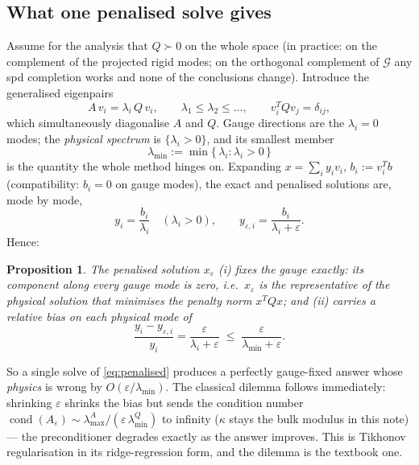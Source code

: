 \documentclass[11pt]{article}
\newtheorem{proposition}{Proposition}
\newcommand{\eps}{\varepsilon}
\begin{document}
\subsection{What one penalised solve gives}
\label{sec:onesolve}

Assume for the analysis that $Q \succ 0$ on the whole space (in
practice: on the complement of the projected rigid modes; on the
orthogonal complement of $\mathcal{G}$ any spd completion works and
none of the conclusions change). Introduce the generalised eigenpairs
\begin{equation}
  A\, v_{i} = \lambda_{i}\, Q\, v_{i}, \qquad
  \lambda_{1} \le \lambda_{2} \le \dots , \qquad
  v_{i}^{T} Q v_{j} = \delta_{ij} ,
  \label{eq:gevp}
\end{equation}
which simultaneously diagonalise $A$ and $Q$. Gauge directions are the
$\lambda_{i} = 0$ modes; the \emph{physical spectrum} is
$\{\lambda_{i} > 0\}$, and its smallest member
\begin{equation}
  \lambda_{\min} := \min \{\, \lambda_{i} : \lambda_{i} > 0 \,\}
  \label{eq:lmin}
\end{equation}
is the quantity the whole method hinges on. Expanding
$x = \sum_i y_i v_i$, $b_i := v_i^T b$ (compatibility: $b_{i} = 0$ on
gauge modes), the exact and penalised solutions are, mode by mode,
\begin{equation}
  y_{i} = \frac{b_{i}}{\lambda_{i}} \quad (\lambda_{i} > 0), \qquad
  y_{\eps,i} = \frac{b_{i}}{\lambda_{i} + \eps} .
\end{equation}
Hence:
\begin{proposition}
  The penalised solution $x_{\eps}$ (i) fixes the gauge exactly: its
  component along every gauge mode is zero, i.e.\ $x_\eps$ is the
  representative of the physical solution that minimises the penalty
  norm $x^{T} Q x$; and (ii) carries a relative bias on each physical
  mode of
  \begin{equation}
    \frac{y_{i} - y_{\eps,i}}{y_{i}}
      = \frac{\eps}{\lambda_{i} + \eps}
      \;\le\; \frac{\eps}{\lambda_{\min} + \eps} .
    \label{eq:bias}
  \end{equation}
\end{proposition}
So a single solve of \eqref{eq:penalised} produces a perfectly
gauge-fixed answer whose \emph{physics} is wrong by
$O(\eps/\lambda_{\min})$. The classical dilemma follows immediately:
shrinking $\eps$ shrinks the bias but sends the condition number
$\operatorname{cond}(A_{\eps}) \sim
\lambda_{\max}^{A}/(\eps\,\lambda_{\min}^{Q})$ to
infinity ($\kappa$ stays the bulk modulus in this note) --- the preconditioner degrades exactly as the answer improves.
This is Tikhonov regularisation in its ridge-regression form, and the
dilemma is the textbook one.
\end{document}
